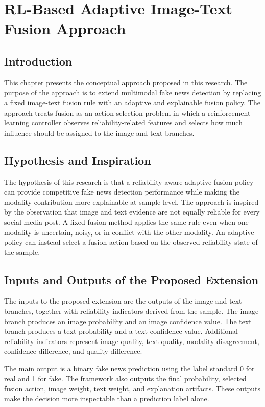 \chapter{RL-Based Adaptive Image-Text Fusion Approach}


\section{Introduction}


This chapter presents the conceptual approach proposed in this research. The purpose of the approach is to extend multimodal fake news detection by replacing a fixed image-text fusion rule with an adaptive and explainable fusion policy. The approach treats fusion as an action-selection problem in which a reinforcement learning controller observes reliability-related features and selects how much influence should be assigned to the image and text branches.


\section{Hypothesis and Inspiration}


The hypothesis of this research is that a reliability-aware adaptive fusion policy can provide competitive fake news detection performance while making the modality contribution more explainable at sample level. The approach is inspired by the observation that image and text evidence are not equally reliable for every social media post. A fixed fusion method applies the same rule even when one modality is uncertain, noisy, or in conflict with the other modality. An adaptive policy can instead select a fusion action based on the observed reliability state of the sample.


\section{Inputs and Outputs of the Proposed Extension}


The inputs to the proposed extension are the outputs of the image and text branches, together with reliability indicators derived from the sample. The image branch produces an image probability and an image confidence value. The text branch produces a text probability and a text confidence value. Additional reliability indicators represent image quality, text quality, modality disagreement, confidence difference, and quality difference.


The main output is a binary fake news prediction using the label standard 0 for real and 1 for fake. The framework also outputs the final probability, selected fusion action, image weight, text weight, and explanation artifacts. These outputs make the decision more inspectable than a prediction label alone.


